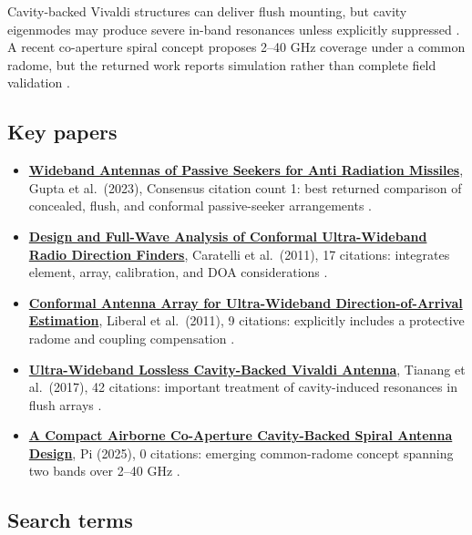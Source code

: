 \documentclass[
  10pt,
]{article}
\providecommand{\tightlist}{%
  \setlength{\itemsep}{0pt}\setlength{\parskip}{0pt}}
\begin{document}
Cavity-backed Vivaldi structures can deliver flush mounting, but cavity
eigenmodes may produce severe in-band resonances unless explicitly
suppressed \citep{tianang2017}. A recent co-aperture spiral concept
proposes 2--40 GHz coverage under a common radome, but the returned work
reports simulation rather than complete field validation \citep{pi2025}.

\subsection{Key papers}\label{key-papers}

\begin{itemize}
\tightlist
\item
  \href{https://consensus.app/papers/details/04301748949257caa17485d3480352f2/?utm_source=chatgpt}{\textbf{Wideband
  Antennas of Passive Seekers for Anti Radiation Missiles}}, Gupta et
  al.~(2023), Consensus citation count 1: best returned comparison of
  concealed, flush, and conformal passive-seeker arrangements
  \citep{gupta2023}.
\item
  \href{https://consensus.app/papers/details/5f166a5e2c715f25a2cfa7d55f20749f/?utm_source=chatgpt}{\textbf{Design
  and Full-Wave Analysis of Conformal Ultra-Wideband Radio Direction
  Finders}}, Caratelli et al.~(2011), 17 citations: integrates element,
  array, calibration, and DOA considerations \citep{caratelli2011}.
\item
  \href{https://consensus.app/papers/details/962901757e715c669ba9962b91c0b96b/?utm_source=chatgpt}{\textbf{Conformal
  Antenna Array for Ultra-Wideband Direction-of-Arrival Estimation}},
  Liberal et al.~(2011), 9 citations: explicitly includes a protective
  radome and coupling compensation \citep{liberal2011}.
\item
  \href{https://consensus.app/papers/details/747aac0a449e5797ad83ea444fb20680/?utm_source=chatgpt}{\textbf{Ultra-Wideband
  Lossless Cavity-Backed Vivaldi Antenna}}, Tianang et al.~(2017), 42
  citations: important treatment of cavity-induced resonances in flush
  arrays \citep{tianang2017}.
\item
  \href{https://consensus.app/papers/details/7848c93584d354f19ce7554e9d95de54/?utm_source=chatgpt}{\textbf{A
  Compact Airborne Co-Aperture Cavity-Backed Spiral Antenna Design}}, Pi
  (2025), 0 citations: emerging common-radome concept spanning two bands
  over 2--40 GHz \citep{pi2025}.
\end{itemize}

\subsection{Search terms}\label{search-terms}
\end{document}
